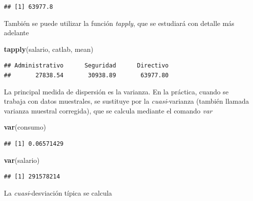 \documentclass[]{book}
\newenvironment{Shaded}{\begin{snugshade}}{\end{snugshade}}
\newcommand{\KeywordTok}[1]{\textcolor[rgb]{0.13,0.29,0.53}{\textbf{#1}}}
\newcommand{\NormalTok}[1]{#1}
\newcommand{\OperatorTok}[1]{\textcolor[rgb]{0.81,0.36,0.00}{\textbf{#1}}}
\newcommand{\StringTok}[1]{\textcolor[rgb]{0.31,0.60,0.02}{#1}}
\begin{document}
\begin{Shaded}
\end{Shaded}

\begin{verbatim}
## [1] 63977.8
\end{verbatim}

También se puede utilizar la función \emph{tapply}, que se estudiará
con detalle más adelante

\begin{Shaded}
\begin{Highlighting}[]
\KeywordTok{tapply}\NormalTok{(salario, catlab, mean)}
\end{Highlighting}
\end{Shaded}

\begin{verbatim}
## Administrativo      Seguridad      Directivo 
##       27838.54       30938.89       63977.80
\end{verbatim}

La principal medida de dispersión es la varianza. En la práctica, cuando
se trabaja con datos muestrales, se sustituye por la \emph{cuasi}-varianza
(también llamada varianza muestral corregida), que se calcula mediante
el comando \emph{var}

\begin{Shaded}
\begin{Highlighting}[]
\KeywordTok{var}\NormalTok{(consumo)}
\end{Highlighting}
\end{Shaded}

\begin{verbatim}
## [1] 0.06571429
\end{verbatim}

\begin{Shaded}
\begin{Highlighting}[]
\KeywordTok{var}\NormalTok{(salario)}
\end{Highlighting}
\end{Shaded}

\begin{verbatim}
## [1] 291578214
\end{verbatim}

La \emph{cuasi}-desviación típica se calcula
\end{document}
